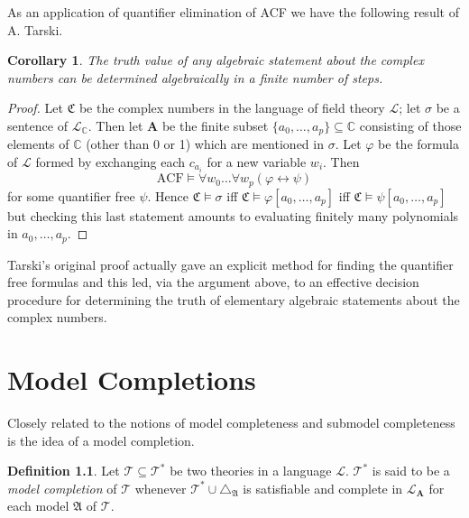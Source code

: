\documentclass[titlepage, oneside]{amsbook}
\theoremstyle{plain}
\newtheorem{corollary}{Corollary}
\theoremstyle{definition}
\newtheorem{definition}{Definition}
\theoremstyle{remark}
\newcommand{\tria}[1]{\ensuremath{\triangle_{\mathfrak{#1}}}}
\newcommand{\theory}{\ensuremath{\mathcal{T}}}
\newcommand{\lan}{\ensuremath{\mathcal{L}}}
\newcommand{\seq}{\ensuremath{\subseteq}}
\newcommand{\ma}{\ensuremath{\mathfrak{A}}}
\newcommand{\mc}{\ensuremath{\mathfrak{C}}}
\newcommand{\ba}{\ensuremath{\mathbf{A}}}
\newcommand{\allforu}[2]{\ensuremath{\forall #1_{0}  \dots  \forall 
#1_{#2}}}
\newcommand{\anot}[2][0]{\ensuremath{ a_{#1} , \dots , a_{#2}}}
\newcommand{\cmodphi}{\ensuremath{\mathfrak C \models \varphi}}
\newcommand{\cmodpsi}{\ensuremath{\mathfrak C \models \psi}}
\begin{document}
As an application of quantifier elimination of ACF we have the following result of A. Tarski.

\begin{corollary}
The truth value of any algebraic statement about the  complex numbers can
be determined algebraically in a finite number of steps.
\end{corollary}

\begin{proof} Let $\mc$ be the complex numbers in the language of field 
theory $\lan$; let $\sigma$ be a sentence of $\lan_{\mathbb C}$. Then let 
$\mathbf A$ be the finite subset $\{ \anot{p} \} \seq \mathbb C$ consisting of those elements of $\mathbb C$ (other than 0 or 1) which are mentioned in 
$\sigma$. Let $\varphi$ be the formula of $\lan$ formed by exchanging
each $c_{a_{i}}$ for a new variable $w_{i}$. Then 
\[
\mbox{ACF} \models \allforu{w}{p} (\varphi \leftrightarrow \psi )
\] 
for some quantifier free $\psi$. Hence 
$\mc \models \sigma$ iff $\cmodphi [ \anot{p} ]$ iff $\cmodpsi [ \anot{p} ]$ 
but checking this last statement amounts to evaluating finitely many 
polynomials in \anot{p}.
\end{proof}

Tarski's original proof actually gave an explicit method for
finding the quantifier free formulas and this led, via the argument
above, to an effective decision procedure for determining the truth of
elementary algebraic statements about the complex numbers.




\chapter{Model Completions}

Closely related to the notions of model completeness and submodel
completeness is the idea of a model completion.

\begin{definition}
%
%
 Let $\theory \seq \theory^{\ast}$ be two theories in a
language $\lan$.  $\theory^{\ast}$ is said to be a \emph{model
completion} of
$\theory$ whenever $\theory^{\ast} \cup \tria A$ is satisfiable and
complete in $\lan_\ba$ for each model $\ma$ of $\theory$.
\end{definition}
\end{document}
